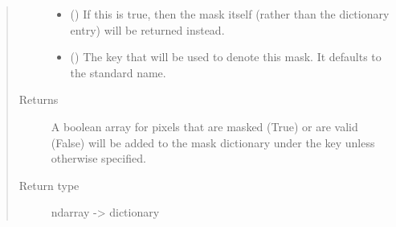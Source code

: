\documentclass[letterpaper,10pt,english]{sphinxmanual}
\begin{document}
\begin{fulllineitems}
\begin{quote}
\begin{description}
\begin{itemize}
\item {} 
 (\sphinxstyleliteralemphasis{\sphinxupquote{ (}}\sphinxstyleliteralemphasis{\sphinxupquote{)}}) \textendash{} If this is true, then the mask itself (rather than the dictionary
entry) will be returned instead.

\item {} 
 (\sphinxstyleliteralemphasis{\sphinxupquote{ (}}\sphinxstyleliteralemphasis{\sphinxupquote{)}}) \textendash{} The key that will be used to denote this mask. It defaults to the
standard name.

\end{itemize}

\item[{Returns}] \leavevmode
{} \textendash{} A boolean array for pixels that are masked (True) or are valid
(False) will be added to the mask dictionary under the
key  unless otherwise specified.

\item[{Return type}] \leavevmode
ndarray -\textgreater{} dictionary

\end{description}\end{quote}

\end{fulllineitems}

\end{document}
